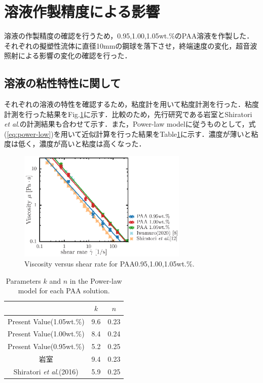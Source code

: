 \section{溶液作製精度による影響}

溶液の作製精度の確認を行うため，0.95,1.00,1.05wt.\%のPAA溶液を作製した．それぞれの擬塑性流体に直径10mmの鋼球を落下させ，終端速度の変化，超音波照射による影響の変化の確認を行った．

\subsection{溶液の粘性特性に関して}
それぞれの溶液の特性を確認するため，粘度計を用いて粘度計測を行った．粘度計測を行った結果をFig.\ref{fig:95-105}に示す．比較のため，先行研究である岩室\cite{ref:8}とShiratori \textit{et al}.\cite{ref:9}の計測結果も合わせて示す．また，Power-law modelに従うものとして，式(\ref{eq:power-low})を用いて近似計算を行った結果をTable\ref{table:005_knParameter}に示す．濃度が薄いと粘度は低く，濃度が高いと粘度は高くなった．

\begin{figure}[H]
    \includegraphics[width=0.72\textwidth]{X-Appendix/concentration/viscosity/viscosity.eps}
    \caption{Viscosity versus shear rate for PAA0.95,1.00,1.05wt.\%.}
    \label{fig:95-105}
\end{figure}

\begin{table}[H]
    \centering
    \caption{Parameters $k$ and $n$ in the Power-law model for each PAA solution.}
    \label{table:005_knParameter}
    \begin{tabular}{c|c|c} \hline
                                                     & $k$ & $n$  \\ \hline \hline
        Present Value(1.05wt.\%)                     & 9.6 & 0.23 \\
        Present Value(1.00wt.\%)                     & 8.4 & 0.24 \\
        Present Value(0.95wt.\%)                     & 5.2 & 0.25 \\
        岩室\cite{ref:8}                             & 9.4 & 0.23 \\
        Shiratori \textit{et al}.(2016)\cite{ref:10} & 5.9 & 0.25 \\ \hline
    \end{tabular}
\end{table}

